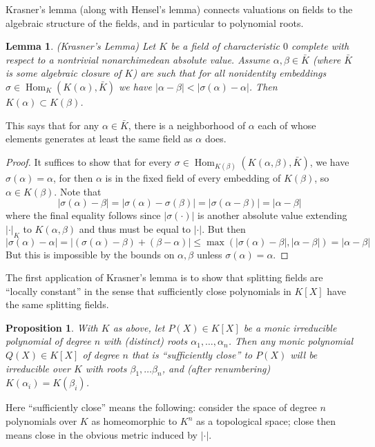 \documentclass[12pt]{article}
\newcommand{\Abs}[1]{\left\lvert #1\right\rvert}
\DeclareMathOperator{\Hom}{Hom}
\newtheorem{lem}[thm]{Lemma}
\newtheorem{prop}[thm]{Proposition}
\begin{document}
Krasner's lemma (along with Hensel's lemma) connects valuations on fields to the algebraic structure of the fields, and in particular to polynomial roots.

\begin{lem} (Krasner's Lemma) Let $K$ be a field of characteristic $0$ complete with respect to a nontrivial nonarchimedean absolute value. Assume $\alpha,\beta\in \bar{K}$ (where $\bar{K}$ is some algebraic closure of $K$) are such that for all nonidentity embeddings $\sigma\in\Hom_K(K(\alpha),\bar{K})$ we have $\Abs{\alpha-\beta} < \Abs{\sigma(\alpha)-\alpha}$. Then $K(\alpha) \subset K(\beta)$.
\end{lem}

This says that for any $\alpha\in \bar{K}$, there is a neighborhood of $\alpha$ each of whose elements generates at least the same field as $\alpha$ does.

\begin{proof} It suffices to show that for every $\sigma\in\Hom_{K(\beta)}(K(\alpha,\beta),\bar{K})$, we have $\sigma(\alpha)=\alpha$, for then $\alpha$ is in the fixed field of every embedding of $K(\beta)$, so $\alpha\in K(\beta)$. Note that
\[\Abs{\sigma(\alpha)-\beta} = \Abs{\sigma(\alpha)-\sigma(\beta)} = \Abs{\sigma(\alpha-\beta)} = \Abs{\alpha-\beta}\]
where the final equality follows since $\Abs{\sigma(\cdot)}$ is another absolute value extending $\Abs{\cdot}_K$ to $K(\alpha,\beta)$ and thus must be equal to $\Abs{\cdot}$. But then
\[\Abs{\sigma(\alpha)-\alpha} = \Abs{(\sigma(\alpha)-\beta)+(\beta-\alpha)} \leq \max(\Abs{\sigma(\alpha)-\beta},\Abs{\alpha-\beta}) = \Abs{\alpha-\beta}\]
But this is impossible by the bounds on $\alpha,\beta$ unless $\sigma(\alpha)=\alpha$.
\end{proof}

The first application of Krasner's lemma is to show that splitting fields are ``locally constant'' in the sense that sufficiently close polynomials in $K[X]$ have the same splitting fields.
\begin{prop} \label{prop:krasner2} With $K$ as above, let $P(X)\in K[X]$ be a monic irreducible polynomial of degree $n$ with (distinct) roots $\alpha_1, \dotsc, \alpha_n$. Then any monic polynomial $Q(X)\in K[X]$ of degree $n$ that is ``sufficiently close'' to $P(X)$ will be irreducible over $K$ with roots $\beta_1, \dotsc \beta_n$, and (after renumbering) $K(\alpha_i) = K(\beta_i)$.
\end{prop}

Here ``sufficiently close'' means the following: consider the space of degree $n$ polynomials over $K$ as homeomorphic to $K^n$ as a topological space; close then means close in the obvious metric induced by $\Abs{\cdot}$.
\end{document}
